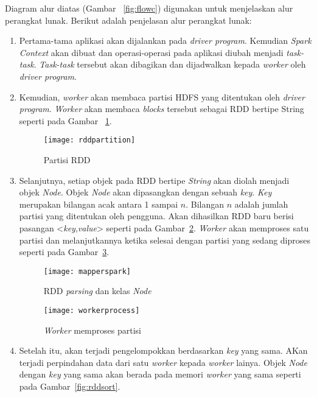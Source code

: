 Diagram alur diatas (Gambar ~\ref{fig:flowc}) digunakan untuk menjelaskan alur perangkat lunak. Berikut adalah penjelasan alur perangkat lunak:

\begin{enumerate}

\item Pertama-tama aplikasi akan dijalankan pada \textit{driver program}. Kemudian \textit{Spark Context} akan dibuat dan operasi-operasi pada aplikasi diubah menjadi \textit{task-task}. \textit{Task-task} tersebut akan dibagikan dan dijadwalkan kepada \textit{worker} oleh \textit{driver program}. 


\item Kemudian, \textit{worker} akan membaca partisi HDFS yang ditentukan oleh \textit{driver program}. \textit{Worker} akan membaca \textit{blocks} tersebut sebagai RDD bertipe String seperti pada Gambar ~\ref{fig:rddpartition}. 

\begin{figure}[H]
    \centering  
    \texttt{[image: rddpartition]}  
    \caption[Partisi RDD]{Partisi RDD} 
    \label{fig:rddpartition} 
\end{figure}

\item Selanjutnya, setiap objek pada RDD bertipe \textit{String} akan diolah menjadi objek \textit{Node}. Objek \textit{Node} akan dipasangkan dengan sebuah \textit{key}. \textit{Key} merupakan bilangan acak antara 1 sampai $n$. Bilangan $n$ adalah jumlah partisi yang ditentukan oleh pengguna. Akan dihasilkan RDD baru berisi pasangan <\textit{key},\textit{value}> seperti pada Gambar~\ref{fig:mapperspark}. \textit{Worker} akan memproses satu partisi dan melanjutkannya ketika selesai dengan partisi yang sedang diproses seperti pada Gambar~\ref{fig:workerprocess}.

\begin{figure}[H]
    \centering  
    \texttt{[image: mapperspark]}  
    \caption[RDD \textit{parsing} dan kelas \textit{Node}]{RDD \textit{parsing} dan kelas \textit{Node}} 
    \label{fig:mapperspark}
\end{figure}

\begin{figure}[H]
    \centering  
    \texttt{[image: workerprocess]}  
    \caption[\textit{Worker} memproses partisi]{\textit{Worker} memproses partisi} 
    \label{fig:workerprocess} 
\end{figure}


\item Setelah itu, akan terjadi pengelompokkan berdasarkan \textit{key} yang sama. AKan terjadi perpindahan data dari satu \textit{worker} kepada \textit{worker} lainya. Objek \textit{Node} dengan \textit{key} yang sama akan berada pada memori \textit{worker} yang sama seperti pada Gambar~\ref{fig:rddsort}.


\end{enumerate}
